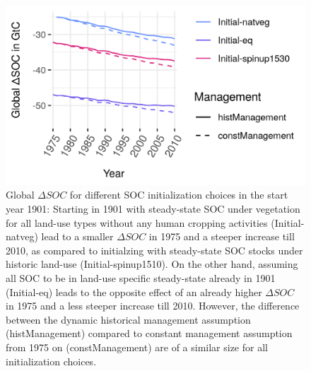 \documentclass[gc, manuscript]{copernicus}
\begin{document}
\begin{figure}[!hp]
\includegraphics[width=12cm]{../ResultNotebooks/Output/Images/scenario_init.png} 
\caption{Global $\Delta SOC$ for different SOC initialization choices in the start year 1901: Starting in 1901 with steady-state SOC under vegetation for all land-use types without any human cropping activities (Initial-natveg) lead to a smaller $\Delta SOC$ in 1975 and a steeper increase till 2010, as compared to initialzing with steady-state SOC stocks under historic land-use (Initial-spinup1510). On the other hand, assuming all SOC to be in land-use specific steady-state already in 1901 (Initial-eq) leads to the opposite effect of an already higher $\Delta SOC$ in 1975 and a less steeper increase till 2010. However, the difference between the dynamic historical management assumption (histManagement) compared to constant management assumption from 1975 on (constManagement) are of a similar size for all initialization choices.}
\label{fig:SOCinit}
\end{figure}
\end{document}
